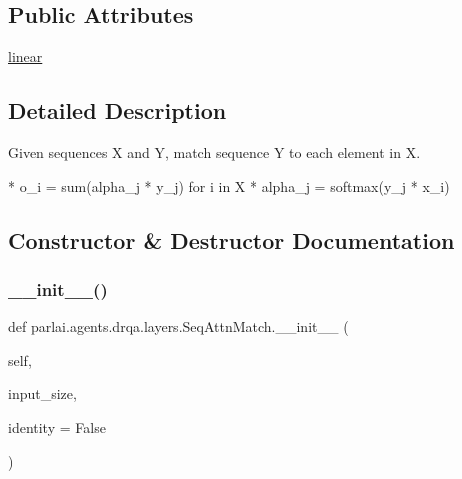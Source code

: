 \subsection*{Public Attributes}
\begin{DoxyCompactItemize}
\item 
\hyperlink{classparlai_1_1agents_1_1drqa_1_1layers_1_1SeqAttnMatch_a6332862a9596fe3e4cb3c323b818a42f}{linear}
\end{DoxyCompactItemize}


\subsection{Detailed Description}
\begin{DoxyVerb}Given sequences X and Y, match sequence Y to each element in X.

* o_i = sum(alpha_j * y_j) for i in X
* alpha_j = softmax(y_j * x_i)
\end{DoxyVerb}
 

\subsection{Constructor \& Destructor Documentation}
\mbox{\label{classparlai_1_1agents_1_1drqa_1_1layers_1_1SeqAttnMatch_abd3be7cddadf751a880aab03c55b0a6c}} 
\subsubsection{\texorpdfstring{\+\_\+\+\_\+init\+\_\+\+\_\+()}{\_\_init\_\_()}}
{\footnotesize\ttfamily def parlai.\+agents.\+drqa.\+layers.\+Seq\+Attn\+Match.\+\_\+\+\_\+init\+\_\+\+\_\+ (\begin{DoxyParamCaption}\item[{}]{self,  }\item[{}]{input\+\_\+size,  }\item[{}]{identity = {\ttfamily False} }\end{DoxyParamCaption})}



